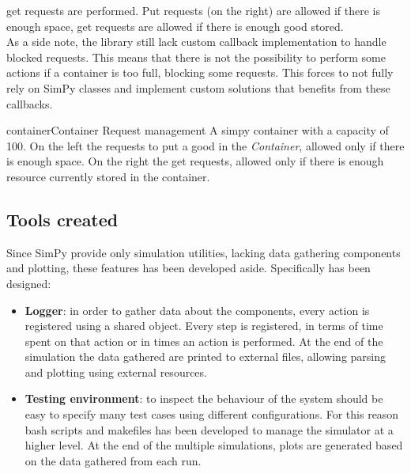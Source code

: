 \begin{itemize}
        get requests are performed. Put requests (on the right) are allowed if
        there is enough space, get requests are allowed if there is enough good
        stored. \\
        As a side note, the library still lack custom callback implementation to
        handle blocked requests. This means that there is not the possibility to
        perform some actions if a container is too full, blocking some requests.
        This forces to not fully rely on SimPy classes and implement custom 
        solutions that benefits from these callbacks.
        \begin{myimage}{container}{Container Request management}
            A simpy container with a capacity of 100. On the left the requests
            to put a good in the \textit{Container}, allowed only if there is
            enough space. On the right the get requests, allowed only if there
            is enough resource
            currently stored in the container.
        \end{myimage}
\end{itemize}

\subsection{Tools created}
Since SimPy provide only simulation utilities, lacking data gathering components
and plotting, these features has been developed aside. Specifically has been designed:
\begin{itemize}
    \item \textbf{Logger}: in order to gather data about the components, every
        action is registered using a shared object. Every step is registered, in
        terms of time spent on that action or in times an action is performed.
        At the end of the simulation the data gathered are printed to external
        files, allowing parsing and plotting using external resources.
    \item \textbf{Testing environment}: to inspect the behaviour of the system
        should be easy to specify many test cases using different
        configurations. For this reason bash scripts and makefiles has been
        developed to manage the simulator at a higher level. At the end of the
        multiple simulations, plots are generated based on the data gathered
        from each run.
\end{itemize}



